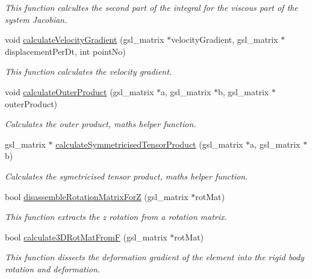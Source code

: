 \begin{DoxyCompactItemize}
\begin{DoxyCompactList}\small\item\em This function calcultes the second part of the integral for the viscous part of the system Jacobian. \end{DoxyCompactList}\item 
\hypertarget{classShapeBase_a858ee3ff9bc490dc6584741f786c9478}{}void \hyperlink{classShapeBase_a858ee3ff9bc490dc6584741f786c9478}{calculate\+Velocity\+Gradient} (gsl\+\_\+matrix $\ast$velocity\+Gradient, gsl\+\_\+matrix $\ast$displacement\+Per\+Dt, int point\+No)\label{classShapeBase_a858ee3ff9bc490dc6584741f786c9478}

\begin{DoxyCompactList}\small\item\em This function calculates the velocity gradient. \end{DoxyCompactList}\item 
\hypertarget{classShapeBase_ac4a71f51dacb8bdf18e1a9914e763016}{}void \hyperlink{classShapeBase_ac4a71f51dacb8bdf18e1a9914e763016}{calculate\+Outer\+Product} (gsl\+\_\+matrix $\ast$a, gsl\+\_\+matrix $\ast$b, gsl\+\_\+matrix $\ast$outer\+Product)\label{classShapeBase_ac4a71f51dacb8bdf18e1a9914e763016}

\begin{DoxyCompactList}\small\item\em Calculates the outer product, maths helper function. \end{DoxyCompactList}\item 
\hypertarget{classShapeBase_a2e5eefd4db5c7a4e8495a197f76446a8}{}gsl\+\_\+matrix $\ast$ \hyperlink{classShapeBase_a2e5eefd4db5c7a4e8495a197f76446a8}{calculate\+Symmetricised\+Tensor\+Product} (gsl\+\_\+matrix $\ast$a, gsl\+\_\+matrix $\ast$b)\label{classShapeBase_a2e5eefd4db5c7a4e8495a197f76446a8}

\begin{DoxyCompactList}\small\item\em Calculates the symetricised tensor product, maths helper function. \end{DoxyCompactList}\item 
bool \hyperlink{classShapeBase_a91a660608ede71c5bfdd1c4956843760}{disassemble\+Rotation\+Matrix\+For\+Z} (gsl\+\_\+matrix $\ast$rot\+Mat)
\begin{DoxyCompactList}\small\item\em This function extracts the z rotation from a rotation matrix. \end{DoxyCompactList}\item 
bool \hyperlink{classShapeBase_a9b249ac3da27e7eeb6e0604a76f15faf}{calculate3\+D\+Rot\+Mat\+From\+F} (gsl\+\_\+matrix $\ast$rot\+Mat)
\begin{DoxyCompactList}\small\item\em This function dissects the deformation gradient of the element into the rigid body rotation and deformation. \end{DoxyCompactList}\end{DoxyCompactItemize}
